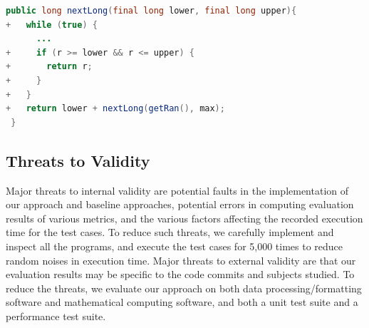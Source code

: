 {\fontsize{10}{10}
\begin{lstlisting}[columns=flexible,language=Java,caption= New Loop with No Correlation, label={list:example-n2}]
  public long nextLong(final long lower, final long upper){
+   while (true) {
      ...
+     if (r >= lower && r <= upper) {
+       return r;
+     }              
+   }
+   return lower + nextLong(getRan(), max);  
 }
\end{lstlisting}

}




\subsection{Threats to Validity}

Major threats to internal validity are potential faults in the implementation of our approach and baseline  approaches, potential errors in computing evaluation results of various metrics, and the various factors affecting the recorded execution time for the test cases. To reduce such threats, we carefully implement and inspect all the programs, and execute the test cases for 5,000 times to reduce random noises in execution time. Major threats to external validity are that our evaluation results may be specific to the code commits and subjects studied. To reduce the threats, we evaluate our approach on both data processing/formatting software and mathematical computing software, and both a unit test suite and a performance test suite. 


